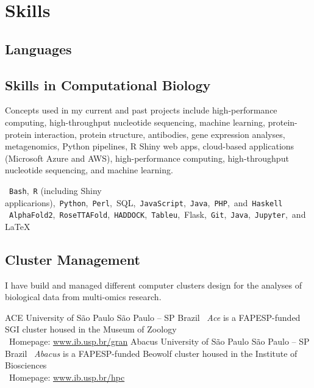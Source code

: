 \documentclass[11pt, letterpaper, sans]{moderncv}
\begin{document}

\section{Skills}

\subsection{Languages}



\subsection{Skills in Computational Biology}

Concepts used in my current and past projects include high-performance computing, high-throughput nucleotide sequencing, machine learning, protein-protein interaction, protein structure, antibodies, gene expression analyses, metagenomics, Python pipelines, R Shiny web apps, cloud-based applications (Microsoft Azure and AWS), high-performance computing, high-throughput nucleotide sequencing, and machine learning.

\vspace{0.5em}

		{\small ~\texttt{Bash},~\texttt{R} (including Shiny applicarions),~\texttt{Python},~\texttt{Perl},~{SQL},~\texttt{JavaScript},~\texttt{Java},~\texttt{PHP},~and~\texttt{Haskell}}
        {\small ~\texttt{AlphaFold2},~\texttt{RoseTTAFold},~\texttt{HADDOCK},~\texttt{Tableu},~{Flask},~\texttt{Git},~\texttt{Java},~\texttt{Jupyter},~and~\LaTeX}

\subsection{Cluster Management}

I have build and managed different computer clusters design for the analyses of biological data from multi-omics research.

		{ACE}
		{University of São Paulo}
		{São Paulo -- SP}
		{Brazil}
		{
			\textbullet~\emph{Ace} is a FAPESP-funded SGI cluster housed in the Museum of Zoology\\
			\textbullet~Homepage: \href{https://www.ib.usp.br/grant/anfibios/researchHPC.html}{www.ib.usp.br/gran}
		}
		{Abacus}
		{University of São Paulo}
		{São Paulo -- SP}
		{Brazil}
		{
			\textbullet~\emph{Abacus} is a FAPESP-funded Beowolf cluster housed in the Institute of Biosciences\\
			\textbullet~Homepage: \href{https://www.ib.usp.br/hpc/}{www.ib.usp.br/hpc}
		}
\end{document}
